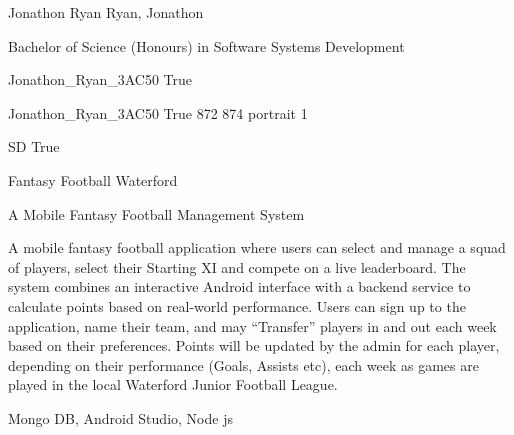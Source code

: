 
\begingroup{}\relax



\def\Key{Jonathon_Ryan_3AC50}

{Jonathon Ryan}
{Ryan, Jonathon}

{Bachelor of Science (Honours) in Software Systems Development}

{Jonathon_Ryan_3AC50}
{True}

{Jonathon_Ryan_3AC50}
{True}
{872}
{874}
{portrait}
{1}

{SD}
{True}

{Fantasy Football Waterford}

{A Mobile Fantasy Football Management System}

{A mobile fantasy football application where users can select and manage a squad of players, select their Starting XI and compete on a live leaderboard. The system combines an interactive Android interface with a backend service to calculate points based on real-world performance. Users can sign up to the application, name their team, and may \textquotedblleft{}Transfer\textquotedblright{} players in and out each week based on their preferences. Points will be updated by the admin for each player, depending on their performance (Goals, Assists etc), each week as games are played in the local Waterford Junior Football League.}

{Mongo DB, Android Studio, Node js}

